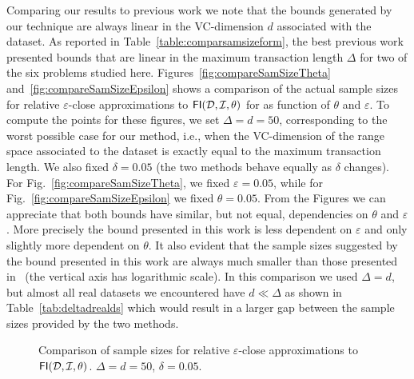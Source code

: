 Comparing our results to previous work we note that the bounds generated by our
technique are always linear in the VC-dimension $d$ associated with the dataset.
As reported in Table~\ref{table:comparsamsizeform}, the best previous
work~\citep{ChakaravarthyPS09} presented bounds that are linear in the maximum
transaction length $\Delta$ for two of the six problems studied here.
Figures~\ref{fig:compareSamSizeTheta} and~\ref{fig:compareSamSizeEpsilon} shows
a comparison of the actual sample sizes for relative $\varepsilon$-close
approximations to $\mathsf{FI}({\cal D},{\cal I},\theta)$ for as function of $\theta$ and
$\varepsilon$. To compute the points for these figures, we set $\Delta=d=50$,
corresponding to the worst possible case for our method, i.e., when the
VC-dimension of the range space associated to the dataset is exactly equal to
the maximum transaction length. We also fixed $\delta=0.05$ (the two methods
behave equally as $\delta$ changes). For Fig.~\ref{fig:compareSamSizeTheta}, we
fixed $\varepsilon=0.05$, while for Fig.~\ref{fig:compareSamSizeEpsilon} we
fixed $\theta=0.05$. From the Figures we can appreciate that both bounds have
similar, but not equal, dependencies on $\theta$ and $\varepsilon$. More
precisely the bound presented in this work is less dependent on $\varepsilon$
and only slightly more dependent on $\theta$. It also evident that the sample
sizes suggested by the bound presented in this work are always much smaller than
those presented in~\citep{ChakaravarthyPS09} (the vertical axis has logarithmic
scale). In this comparison we used $\Delta=d$, but almost all real datasets
we encountered have $d\ll\Delta$ as shown in
Table~\ref{tab:deltadrealds} which would result in a larger gap between the
sample sizes provided by the two methods.

\begin{figure}[tp]
  \centering
  \hfill
  \caption{Comparison of sample sizes for relative $\varepsilon$-close approximations to
  $\mathsf{FI}({\cal D},{\cal I},\theta)$. $\Delta=d=50$, $\delta=0.05$.}
  \label{fig:compareSamSize}
\end{figure}

